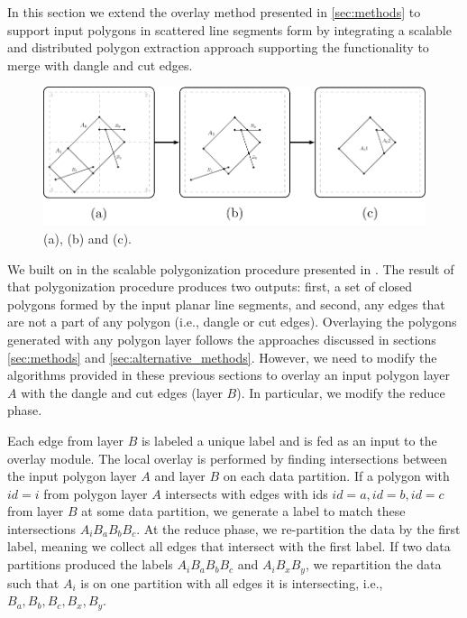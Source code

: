 In this section we extend the overlay method presented in \ref{sec:methods} to support input polygons in scattered line segments form by integrating a scalable and distributed polygon extraction approach supporting the functionality to merge with dangle and cut edges.

 \begin{figure}
    \centering
    \includegraphics[width=\textwidth]{chapterExtension/dangles_cuts/DAC}
    \caption{(a), (b) and (c).} \label{fig:dangles_cuts}
 \end{figure}
 
We built on in the scalable polygonization procedure presented in \cite{abdelhafeez_ddcel_2023}.  The result of that polygonization procedure produces two outputs: first, a set of closed polygons formed by the input planar line segments, and second, any edges that are not a part of any polygon (i.e., dangle or cut edges).  Overlaying the polygons generated with any polygon layer follows the approaches discussed in sections \ref{sec:methods} and \ref{sec:alternative_methods}.  However, we need to modify the algorithms provided in these previous sections to overlay an input polygon layer $A$ with the dangle and cut edges (layer $B$). In particular, we modify the reduce phase.

Each edge from layer $B$ is labeled a unique label and is fed as an input to the overlay module.  The local overlay is performed by finding intersections between the input polygon layer $A$ and layer $B$ on each data partition.  If a polygon with $id = i$ from polygon layer $A$ intersects with edges with ids $id = a, id = b, id = c$ from layer $B$ at some data partition, we generate a label to match these intersections $A_{i} B_{a} B_{b} B_{c}$.   At the reduce phase, we re-partition the data by the first label, meaning we collect all edges that intersect with the first label.  If two data partitions produced the labels $A_{i} B_{a} B_{b} B_{c}$ and $A_{i} B_{x} B_{y}$, we repartition the data such that $A_{i}$ is on one partition with all edges it is intersecting, i.e., $B_{a}, B_{b}, B_{c}, B_{x}, B_{y}$.

